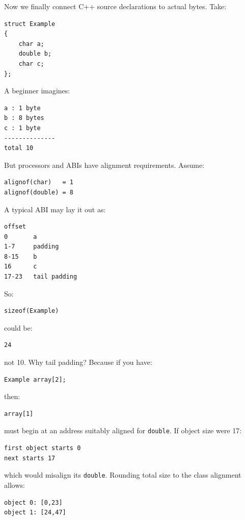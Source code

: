 Now we finally connect C++ source declarations to actual bytes. Take:

\begin{verbatim}
struct Example
{
    char a;
    double b;
    char c;
};
\end{verbatim}

A beginner imagines:

\begin{verbatim}
a : 1 byte
b : 8 bytes
c : 1 byte
--------------
total 10
\end{verbatim}

But processors and ABIs have alignment requirements. Assume:

\begin{verbatim}
alignof(char)   = 1
alignof(double) = 8
\end{verbatim}

A typical ABI may lay it out as:

\begin{verbatim}
offset
0       a
1-7     padding
8-15    b
16      c
17-23   tail padding
\end{verbatim}

So:

\begin{verbatim}
sizeof(Example)
\end{verbatim}

could be:

\begin{verbatim}
24
\end{verbatim}

not 10. Why tail padding? Because if you have:

\begin{verbatim}
Example array[2];
\end{verbatim}

then:

\begin{verbatim}
array[1]
\end{verbatim}

must begin at an address suitably aligned for \texttt{double}. If object size were 17:

\begin{verbatim}
first object starts 0
next starts 17
\end{verbatim}

which would misalign its \texttt{double}. Rounding total size to the class alignment allows:

\begin{verbatim}
object 0: [0,23]
object 1: [24,47]
\end{verbatim}

